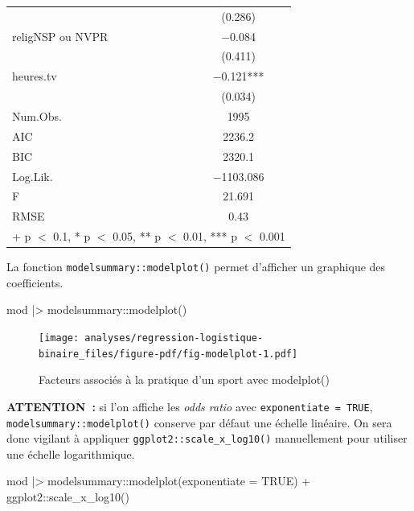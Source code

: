 \documentclass[
  letterpaper,
  DIV=11,
  numbers=noendperiod,
  oneside]{scrreprt}
\newenvironment{Shaded}{\begin{snugshade}}{\end{snugshade}}
\newcommand{\AttributeTok}[1]{\textcolor[rgb]{0.40,0.45,0.13}{#1}}
\newcommand{\ConstantTok}[1]{\textcolor[rgb]{0.56,0.35,0.01}{#1}}
\newcommand{\FunctionTok}[1]{\textcolor[rgb]{0.28,0.35,0.67}{#1}}
\newcommand{\NormalTok}[1]{\textcolor[rgb]{0.00,0.23,0.31}{#1}}
\newcommand{\SpecialCharTok}[1]{\textcolor[rgb]{0.37,0.37,0.37}{#1}}
\begin{document}
\begin{table}
\begin{tabular}[t]{lc}
 & (\num{0.286})\\
religNSP ou NVPR & \num{-0.084}\\
 & (\num{0.411})\\
heures.tv & \num{-0.121}***\\
 & (\num{0.034})\\
\midrule
Num.Obs. & \num{1995}\\
AIC & \num{2236.2}\\
BIC & \num{2320.1}\\
Log.Lik. & \num{-1103.086}\\
F & \num{21.691}\\
RMSE & \num{0.43}\\
\bottomrule
\multicolumn{2}{l}{\rule{0pt}{1em}+ p $<$ 0.1, * p $<$ 0.05, ** p $<$ 0.01, *** p $<$ 0.001}\\
\end{tabular}
\end{table}

La fonction \texttt{modelsummary::modelplot()} permet d'afficher un
graphique des coefficients.

\begin{Shaded}
\begin{Highlighting}[]
\NormalTok{mod }\SpecialCharTok{|\textgreater{}}\NormalTok{ modelsummary}\SpecialCharTok{::}\FunctionTok{modelplot}\NormalTok{()}
\end{Highlighting}
\end{Shaded}

\begin{figure}[H]

{\centering \texttt{[image: analyses/regression-logistique-binaire\_files/figure-pdf/fig-modelplot-1.pdf]}

}

\caption{\label{fig-modelplot}Facteurs associés à la pratique d'un sport
avec modelplot()}

\end{figure}

\textbf{ATTENTION~:} si l'on affiche les \emph{odds ratio} avec
\texttt{exponentiate\ =\ TRUE}, \texttt{modelsummary::modelplot()}
conserve par défaut une échelle linéaire. On sera donc vigilant à
appliquer \texttt{ggplot2::scale\_x\_log10()} manuellement pour utiliser
une échelle logarithmique.

\begin{Shaded}
\begin{Highlighting}[]
\NormalTok{mod }\SpecialCharTok{|\textgreater{}}
\NormalTok{  modelsummary}\SpecialCharTok{::}\FunctionTok{modelplot}\NormalTok{(}\AttributeTok{exponentiate =} \ConstantTok{TRUE}\NormalTok{) }\SpecialCharTok{+}
\NormalTok{  ggplot2}\SpecialCharTok{::}\FunctionTok{scale\_x\_log10}\NormalTok{()}
\end{Highlighting}
\end{Shaded}
\end{document}
